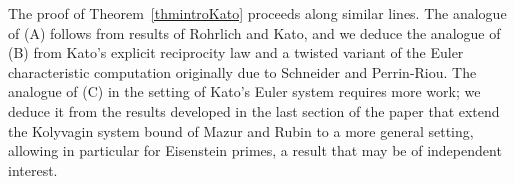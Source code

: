 \documentclass[10pt,reqno]{amsart}
\numberwithin{equation}{section}
\theoremstyle{plain}
\theoremstyle{definition}
\theoremstyle{definition}
\theoremstyle{plain}
\theoremstyle{plain}
\theoremstyle{plain}
\theoremstyle{plain}
\theoremstyle{plain}
\theoremstyle{plain}
\begin{document}


The proof of Theorem~\ref{thmintroKato} proceeds along similar lines. The analogue of (A) follows from results of Rohrlich and Kato, and we deduce the analogue of (B) from Kato's explicit reciprocity law and a twisted variant of the Euler characteristic computation originally due to Schneider and Perrin-Riou.
The analogue of (C) in the setting of Kato's Euler system requires more work; we deduce it from the results developed in the last section of the paper that extend the Kolyvagin system bound of Mazur and Rubin \cite{mazrub} to a more general setting, allowing in particular for Eisenstein primes, a result that may be of independent interest. 
\end{document}
